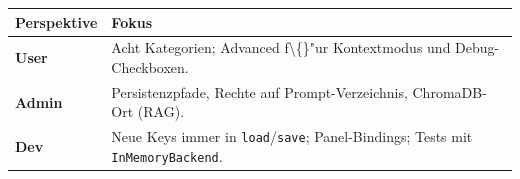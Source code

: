 \begin{center}
\begin{tabular}{ll}
\hline
Perspektive & Fokus \\
\hline
\textbf{User} & Acht Kategorien; Advanced f\textbackslash\{\}"ur Kontextmodus und Debug-Checkboxen. \\
\textbf{Admin} & Persistenzpfade, Rechte auf Prompt-Verzeichnis, ChromaDB-Ort (RAG). \\
\textbf{Dev} & Neue Keys immer in \texttt{load}/\texttt{save}; Panel-Bindings; Tests mit \texttt{InMemoryBackend}. \\
\hline
\end{tabular}
\end{center}
